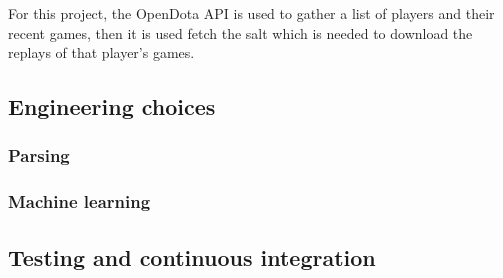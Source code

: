 \documentclass[Report.tex]{subfiles}
\begin{document}
For this project, the OpenDota API is used to gather a list of players and their recent games, then it is used fetch the salt which is needed to download the replays of that player's games. 


\subsection{Engineering choices}

\subsubsection{Parsing}

\subsubsection{Machine learning}


\subsection{Testing and continuous integration}
\end{document}
